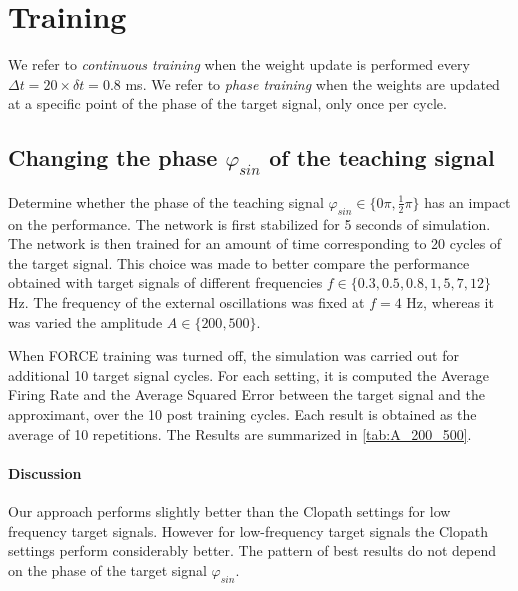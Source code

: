 \documentclass[10pt,a4paper, final]{report} %
\begin{document}
\section{Training}

We refer to \textit{continuous training} when the weight update is performed every $\Delta t = 20 \times \delta t = 0.8$ ms. We refer to \textit{phase training} when the weights are updated at a specific point of the phase of the target signal, only once per cycle.

\subsection{Changing the phase $\varphi_{sin}$ of the teaching signal}
Determine whether the phase of the teaching signal $\varphi_{sin} \in \{0 \pi, \frac{1}{2} \pi \}$ has an impact on the performance. The network is first stabilized for 5 seconds of simulation. The network is then trained for an amount of time corresponding to 20 cycles of the target signal. This choice was made to better compare the performance obtained with target signals of different frequencies $f \in \{0.3, 0.5, 0.8, 1, 5, 7, 12 \}$ Hz. The frequency of the external oscillations was fixed at $f = 4$ Hz, whereas it was varied the amplitude $A \in \{200, 500\}$. 

When FORCE training was turned off, the simulation was carried out for additional 10 target signal cycles. For each setting, it is computed the Average Firing Rate and the Average Squared Error between the target signal and the approximant, over the 10 post training cycles. Each result is obtained as the average of 10 repetitions. The Results are summarized in \autoref{tab:A_200_500}.

\paragraph{Discussion} Our approach performs slightly better than the Clopath settings for low frequency target signals. However for low-frequency target signals the Clopath settings perform considerably better. The pattern of best results do not depend on the phase of the target signal $\varphi_{sin}$.
\end{document}
